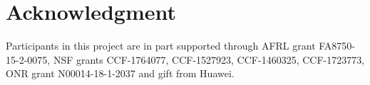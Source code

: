 \documentclass[sigconf, screen]{acmart}
\begin{document}
\maketitle












\section{Acknowledgment}

Participants in this project are in part supported through AFRL grant FA8750-15-2-0075, NSF grants CCF-1764077, CCF-1527923, CCF-1460325, CCF-1723773, ONR grant N00014-18-1-2037 and gift from Huawei.

\balance


\end{document}
